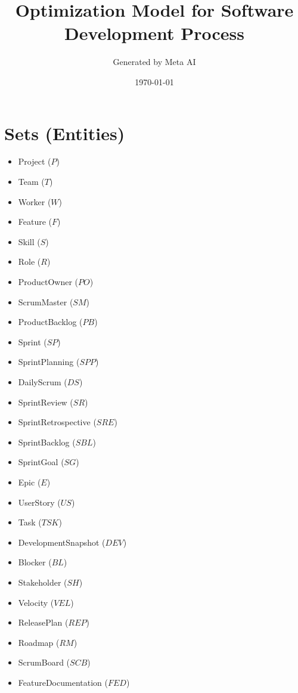\documentclass{article}
\title{Optimization Model for Software Development Process}
\author{Generated by Meta AI}
\date{\today}
\begin{document}
\maketitle
\tableofcontents

\section{Sets (Entities)}
\begin{itemize}
    \item Project ($P$)
    \item Team ($T$)
    \item Worker ($W$)
    \item Feature ($F$)
    \item Skill ($S$)
    \item Role ($R$)
    \item ProductOwner ($PO$)
    \item ScrumMaster ($SM$)
    \item ProductBacklog ($PB$)
    \item Sprint ($SP$)
    \item SprintPlanning ($SPP$)
    \item DailyScrum ($DS$)
    \item SprintReview ($SR$)
    \item SprintRetrospective ($SRE$)
    \item SprintBacklog ($SBL$)
    \item SprintGoal ($SG$)
    \item Epic ($E$)
    \item UserStory ($US$)
    \item Task ($TSK$)
    \item DevelopmentSnapshot ($DEV$)
    \item Blocker ($BL$)
    \item Stakeholder ($SH$)
    \item Velocity ($VEL$)
    \item ReleasePlan ($REP$)
    \item Roadmap ($RM$)
    \item ScrumBoard ($SCB$)
    \item FeatureDocumentation ($FED$)
\end{itemize}
\end{document}
